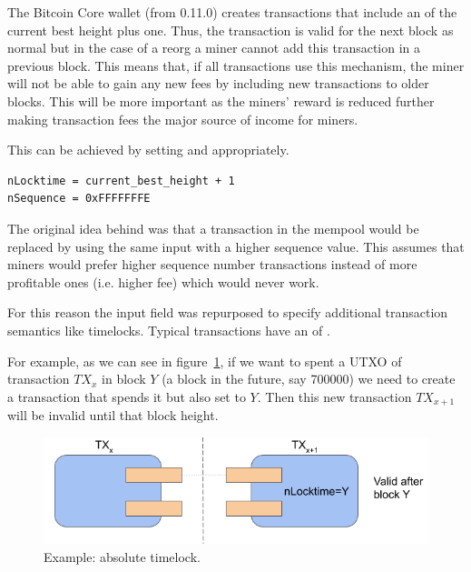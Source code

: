 The Bitcoin Core wallet (from 0.11.0) creates transactions that include an  of the current best height plus one. Thus, the transaction is valid for the next block as normal but in the case of a reorg a miner cannot add this transaction in a previous block. This means that, if all transactions use this mechanism, the miner will not be able to gain any new fees by including new transactions to older blocks.
This will be more important as the miners' reward is reduced further making transaction fees the major source of income for miners.

This can be achieved by setting  and  appropriately.

\begin{emphbox}
\begin{lstlisting}[style=Pseudomath]
nLocktime = current_best_height + 1
nSequence = 0xFFFFFFFE
\end{lstlisting}
\end{emphbox}

The original idea behind  was that a transaction in the mempool would be replaced by using the same input with a higher sequence value. This assumes that miners would prefer higher sequence number transactions instead of more profitable ones (i.e. higher fee) which would never work. 

For this reason the  input field was repurposed to specify additional transaction semantics like timelocks. Typical transactions have an  of .

For example, as we can see in figure~\ref{fig:absolute-timelock}, if we want to spent a UTXO of transaction $TX_{x}$ in block $Y$ (a block in the future, say 700000) we need to create a transaction that spends it but also set  to $Y$. Then this new transaction $TX_{x+1}$ will be invalid until that block height.

\vspace{0.5em}
\begin{figure}[H]
\begin{center}
\includegraphics[scale=0.6]{images/absolute-timelock}
\caption{Example: absolute timelock.}
\label{fig:absolute-timelock}
\end{center}
\end{figure}

